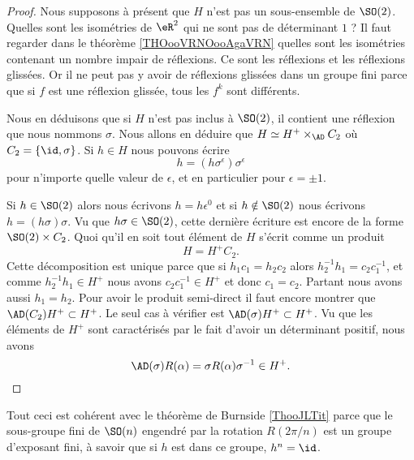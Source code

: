 \begin{proof}
        Nous supposons à présent que \( H\) n'est pas un sous-ensemble de \( \SO(2)\). Quelles sont les isométries de \( \eR^2\) qui ne sont pas de déterminant \( 1\) ? Il faut regarder dans le théorème \ref{THOooVRNOooAgaVRN} quelles sont les isométries contenant un nombre impair de réflexions. Ce sont les réflexions et les réflexions glissées. Or il ne peut pas y avoir de réflexions glissées dans un groupe fini parce que si \( f\) est une réflexion glissée, tous les \( f^k\) sont différents.

        Nous en déduisons que si \( H\) n'est pas inclus à \( \SO(2)\), il contient une réflexion que nous nommons \( \sigma\). Nous allons en déduire que \( H\simeq H^+\times_{\AD}C_2\) où \( C_2=\{ \id,\sigma \}\). Si \( h\in H\) nous pouvons écrire 
        \begin{equation}
            h=(h\sigma^{\epsilon})\sigma^{\epsilon}
        \end{equation}
        pour n'importe quelle valeur de \( \epsilon\), et en particulier pour \( \epsilon=\pm 1\). 

        Si \( h\in \SO(2)\) alors nous écrivons \( h=h\epsilon^{0}\) et si \( h\notin\SO(2)\) nous écrivons \( h=(h\sigma)\sigma\). Vu que \( h\sigma\in\SO(2)\), cette dernière écriture est encore de la forme \( \SO(2)\times C_2\). Quoi qu'il en soit tout élément de \( H\) s'écrit comme un produit 
        \begin{equation}
            H=H^+C_2.
        \end{equation}
        Cette décomposition est unique parce que si \( h_1c_1=h_2c_2\) alors \( h_2^{-1}h_1=c_2c_1^{-1}\), et comme \( h_2^{-1}h_1\in H^+\) nous avons \( c_2c_1^{-1}\in H^+\) et donc \( c_1=c_2\). Partant nous avons aussi \( h_1=h_2\). Pour avoir le produit semi-direct il faut encore montrer que \( \AD(C_2)H^+\subset H^+\). Le seul cas à vérifier est \( \AD(\sigma)H^+\subset H^+\). Vu que les éléments de \( H^+\) sont caractérisés par le fait d'avoir un déterminant positif, nous avons 
        \begin{equation}
            \AD(\sigma)R(\alpha)=\sigma R(\alpha)\sigma^{-1}\in H^+.
        \end{equation}
\end{proof}

\begin{remark}
    Tout ceci est cohérent avec le théorème de Burnside \ref{ThooJLTit} parce que le sous-groupe fini de \( \SO(n)\) engendré par la rotation \( R(2\pi/n)\) est un groupe d'exposant fini, à savoir que si \( h\) est dans ce groupe, \( h^n=\id\).
\end{remark}

